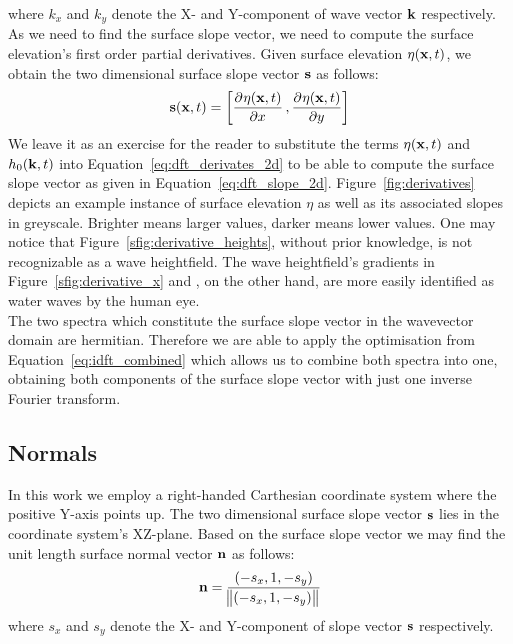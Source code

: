 where $k_x$ and $k_y$ denote the X- and Y-component of wave vector $\mathbf{k}$ 
respectively. As we need to find the surface slope vector, we need to compute 
the surface elevation's first order partial derivatives. Given surface 
elevation $\eta(\mathbf{x},t)$, we obtain the two dimensional surface slope 
vector $\mathbf{s}$ as follows:
\begin{equation}
\label{eq:dft_slope_2d}
 \mvec{s}(\mvec{x},t) = \left[\dpd{\eta(\mvec{x},t)}{x}, \dpd{\eta(\mvec{x},t)}{y}\right]
\end{equation}
We leave it as an exercise for the reader to substitute the terms $\eta(\mathbf{x},t)$
and $h_0(\mathbf{k},t)$ into Equation~\ref{eq:dft_derivates_2d} to be able to
compute the surface slope vector as given in Equation~\ref{eq:dft_slope_2d}.
Figure~\ref{fig:derivatives} depicts an example instance of surface 
elevation $\eta$ as well as its associated slopes in greyscale. Brighter 
means larger values, darker means lower values. One may notice that 
Figure~\ref{sfig:derivative_heights}, without prior knowledge, is not 
recognizable as a wave heightfield. The wave heightfield's gradients in
Figure~\ref{sfig:derivative_x} and , on the 
other hand, are more easily identified as water waves by the human eye.\\

The two spectra which constitute the surface slope vector in the wavevector domain
are hermitian. Therefore we are able to apply the optimisation from
Equation~\ref{eq:idft_combined} which allows us to combine both spectra into one,
obtaining both components of the surface slope vector with just one inverse Fourier transform.
%
\subsection{Normals}
%
In this work we employ a right-handed Carthesian coordinate system where the positive
Y-axis points up. The two dimensional surface slope vector $\mathbf{s}$ lies in the
coordinate system's XZ-plane. Based on the surface slope vector we may find the unit
length surface normal vector $\mathbf{n}$ as follows:
\begin{equation}
 \mathbf{n} = \frac{(-s_x, 1, -s_y)}{\norm{(-s_x, 1, -s_y)}}
\end{equation}
where $s_x$ and $s_y$ denote the X- and Y-component of slope vector $\mathbf{s}$ 
respectively.
%
